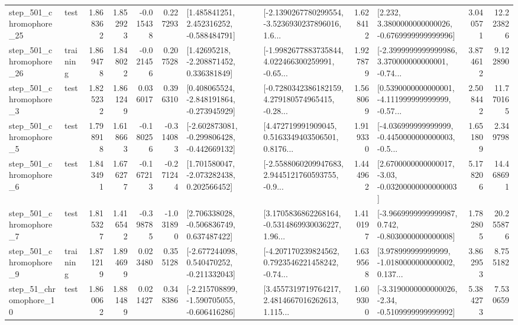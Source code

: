 \begin{tabular}{llrrrrllrlrr}
  step\_501\_chromophore\_25 &      test &      1.868362 &    1.852923 &     -0.015438 &  0.227293 &    [1.485841251, 2.452316252, -0.588484791] &  [-2.1390267780299554, -3.5236930237896016, 1.6... &       1.628412 &   [2.232, 3.3800000000000026, -0.6769999999999996] &            3.040571 &         12.223826 \\
  step\_501\_chromophore\_26 &  training &      1.869478 &    1.848022 &     -0.021456 &  0.207528 &     [1.42695218, -2.208871452, 0.336381849] &  [-1.9982677883735844, 4.022466300259991, -0.65... &       1.927879 &  [-2.3999999999999986, 3.370000000000001, -0.74... &            3.874612 &          9.122890 \\
   step\_501\_chromophore\_3 &      test &      1.825232 &    1.861249 &      0.036017 &  0.396310 &   [0.408065524, -2.848191864, -0.273945929] &  [-0.7280342386182159, 4.279180574965415, -0.28... &       1.568069 &  [0.5390000000000001, -4.111999999999999, -0.57... &            2.508442 &         11.770165 \\
   step\_501\_chromophore\_5 &      test &      1.798918 &    1.618663 &     -0.180256 & -0.314083 &  [-2.602873081, -0.299806428, -0.442669132] &  [4.472719991909045, 0.5163349403506501, 0.8176... &       1.919330 &  [-4.036999999999999, -0.4450000000000003, -0.5... &            1.651809 &          2.349798 \\
   step\_501\_chromophore\_6 &      test &      1.843491 &    1.676277 &     -0.167213 & -0.271244 &    [1.701580047, -2.073282438, 0.202566452] &  [-2.5588060209947683, 2.9445121760593755, -0.9... &       1.444962 &  [2.6700000000000017, -3.03, -0.03200000000000003] &            5.178206 &         14.468691 \\
   step\_501\_chromophore\_7 &      test &      1.815327 &    1.416542 &     -0.398785 & -1.031890 &    [2.706338028, -0.506836749, 0.637487422] &  [3.1705836862268164, -0.5314869930036227, 1.96... &       1.410197 &  [-3.9669999999999987, 0.742, -0.8030000000000008] &            1.782805 &         20.255876 \\
   step\_501\_chromophore\_9 &  training &      1.871219 &    1.894699 &      0.023480 &  0.355128 &   [-2.677244098, 0.540470252, -0.211332043] &  [-4.207170239824562, 0.7923546221458242, -0.74... &       1.639568 &  [3.978999999999999, -1.0180000000000002, 0.137... &            3.862953 &          8.755182 \\
   step\_51\_chromophore\_10 &      test &      1.860062 &    1.881489 &      0.021427 &  0.348386 &  [-2.215708899, -1.590705055, -0.606416286] &  [3.4557319719764217, 2.4814667016262613, 1.115... &       1.609300 &  [-3.3190000000000026, -2.34, -0.5109999999999992] &            5.384273 &          7.530659 \\

\end{tabular}

